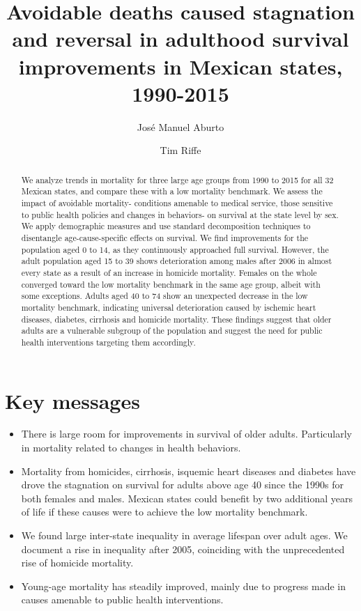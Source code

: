 \documentclass[11.5pt]{article}
\title{Avoidable deaths caused stagnation and reversal in adulthood survival improvements in Mexican states, 1990-2015}
\author[1]{Jos\'e Manuel Aburto}
\author[2]{Tim Riffe}
\affil[1]{Department of Public Health \& Max Planck Odense Center on the Biodemography of Aging at University of Southern Denmark}
\affil[2]{Max Planck Institute for Demographic Research}
\begin{document}
\maketitle

\begin{abstract}
We analyze trends in mortality for three large age groups from 1990 to 2015 for all 32 Mexican states, and compare these with a low mortality benchmark. We assess the impact of avoidable mortality- conditions amenable to medical service, those sensitive to public health policies and changes in behaviors- on survival at the state level by sex. We apply demographic measures and use standard decomposition techniques to disentangle age-cause-specific effects on survival. We find improvements for the population aged 0 to 14, as they continuously approached full survival. However, the adult population aged 15 to 39 shows deterioration among males after 2006 in almost every state as a result of an increase in homicide mortality. Females on the whole converged toward the low mortality benchmark in the same age group, albeit with some exceptions. Adults aged 40 to 74 show an unexpected decrease in the low mortality benchmark, indicating universal deterioration caused by ischemic heart diseases, diabetes, cirrhosis and homicide mortality. These findings suggest that older adults are a vulnerable subgroup of the population and suggest the need for public health interventions targeting them accordingly.

\end{abstract}

\section*{Key messages}
\begin{itemize}
\item There is large room for improvements in survival of older adults. Particularly in mortality related to changes in health behaviors. 

\item Mortality from homicides, cirrhosis, isquemic heart diseases and diabetes have drove the stagnation on survival for adults above age 40 since the 1990s for both females and males. Mexican states could benefit by two additional years of life if  these causes were to achieve the low mortality benchmark.

\item We found large inter-state inequality in average lifespan over adult ages. We document a rise in inequality after 2005, coinciding with the unprecedented rise of homicide mortality. 

\item Young-age mortality has steadily improved, mainly due to progress made in causes amenable to public health interventions.

\end{itemize}
\end{document}
